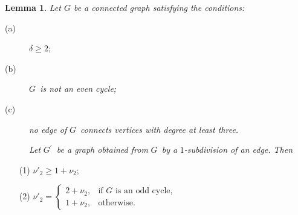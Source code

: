 \documentclass[fleqn,12pt,twoside]{article}
\newtheorem{lemma}{Lemma}
\begin{document}
\begin{lemma}
\label{Edge Subdivision}Let $G$ be a connected graph satisfying the
conditions:
\end{lemma}

\begin{description}
\item[(a)] $\delta \geq 2$;

\item[(b)] $G$\textit{\ is not an even cycle;}

\item[(c)] \textit{no edge of }$G$\textit{\ connects vertices with degree at
least three.}

\item[ ] \textit{Let }$G^{\prime }$\textit{\ be a graph obtained from }$G$\textit{\ by a }$1$\textit{-subdivision of an edge. Then}
\end{description}

\begin{enumerate}
\item[(1)] $\nu' _{2}\geq 1+\nu _{2}$;

\item[(2)] $\nu' _{2}=\left\{
\begin{array}{ll}
2+\nu _{2}, & \text{if }G\text{ is an odd cycle,} \\
1+\nu _{2}, & \text{otherwise.}\end{array}\right. $
\end{enumerate}
\end{document}
